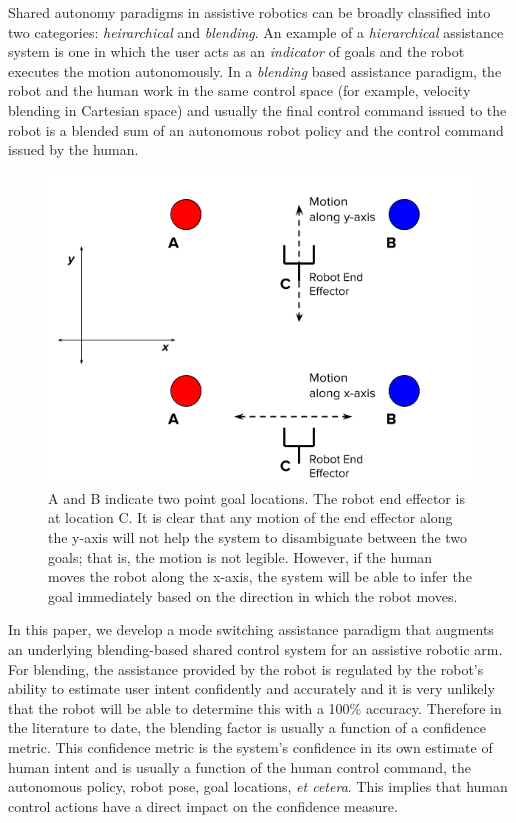 \documentclass[conference]{IEEEtran}
\begin{document}
Shared autonomy paradigms in assistive robotics can be broadly classified into two categories: \textit{heirarchical} and \textit{blending}. An example of a \textit{hierarchical} assistance system is one in which the user acts as an \textit{indicator} of goals and the robot executes the motion autonomously. In a \textit{blending} based assistance paradigm, the robot and the human work in the same control space (for example, velocity blending in Cartesian space) and usually the final control command issued to the robot is a blended sum of an autonomous robot policy and the control command issued by the human. 
\begin{figure}[t]
	\centering
	\includegraphics[width = 1.0\hsize]{./figures/DE.png}
	\caption{A and B indicate two point goal locations. The robot end effector is at location C. It is clear that any motion of the end effector along the y-axis will not help the system to disambiguate between the two goals; that is, the motion is not legible. However, if the human moves the robot along the x-axis, the system will be able to infer the goal immediately based on the direction in which the robot moves. }
	\label{DE}
\end{figure}
In this paper, we develop a mode switching assistance paradigm that augments an underlying blending-based shared control system for an assistive robotic arm. For blending, the assistance provided by the robot is regulated by the robot's ability to estimate user intent confidently and accurately and it is very unlikely that the robot will be able to determine this with a 100\% accuracy.  Therefore in the literature to date, the blending factor is usually a function of a confidence metric. This confidence metric is the system's confidence in its own estimate of human intent and is usually a function of the human control command, the autonomous policy, robot pose, goal locations, \textit{et cetera}. This implies that human control actions have a direct impact on the confidence measure. 
\end{document}
